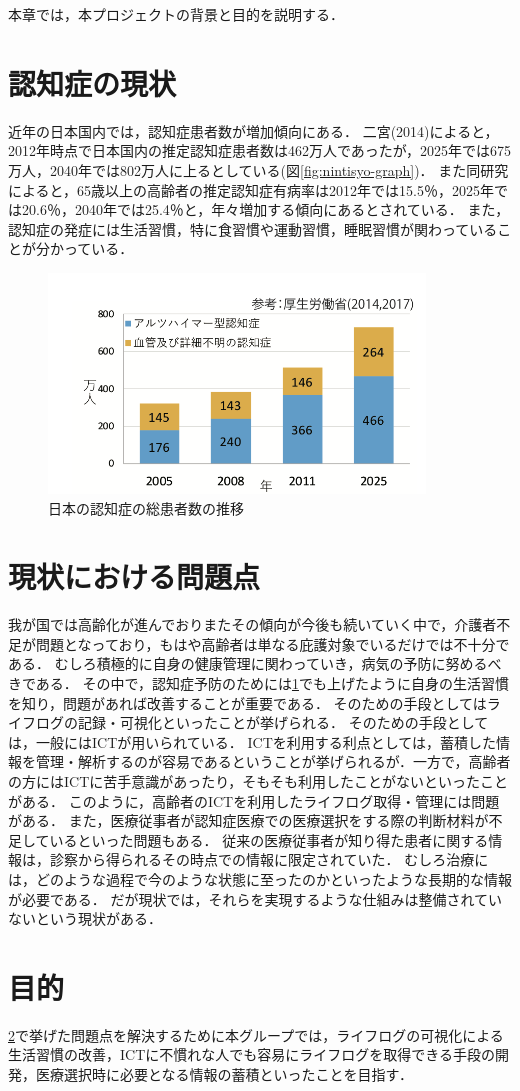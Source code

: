 \documentclass[../report]{subfiles}
\begin{document}
本章では，本プロジェクトの背景と目的を説明する．

\section{認知症の現状} \label{sec:genzyou}
近年の日本国内では，認知症患者数が増加傾向にある．
二宮(2014)によると，2012年時点で日本国内の推定認知症患者数は462万人であったが，2025年では675万人，2040年では802万人に上るとしている(図\ref{fig:nintisyo-graph})．
また同研究によると，65歳以上の高齢者の推定認知症有病率は2012年では15.5％，2025年では20.6％，2040年では25.4％と，年々増加する傾向にあるとされている．
また，認知症の発症には生活習慣，特に食習慣や運動習慣，睡眠習慣が関わっていることが分かっている\cite{seikatsu}．
\begin{figure}[htbp]
    \begin{center}
        \includegraphics[width=10cm]{imgs/ninchisyo-graph.png}
        \caption{日本の認知症の総患者数の推移}
        \label{fig:ninchisyo-graph}
    \end{center}
\end{figure}

\section{現状における問題点} \label{sec:mondai}
我が国では高齢化が進んでおりまたその傾向が今後も続いていく中で，介護者不足が問題となっており，もはや高齢者は単なる庇護対象でいるだけでは不十分である．
むしろ積極的に自身の健康管理に関わっていき，病気の予防に努めるべきである．
その中で，認知症予防のためには\ref{sec:genzyou}でも上げたように自身の生活習慣を知り，問題があれば改善することが重要である．
そのための手段としてはライフログの記録・可視化といったことが挙げられる\cite{lifelog}．
そのための手段としては，一般にはICTが用いられている．
ICTを利用する利点としては，蓄積した情報を管理・解析するのが容易であるということが挙げられるが．一方で，高齢者の方にはICTに苦手意識があったり，そもそも利用したことがないといったことがある．
このように，高齢者のICTを利用したライフログ取得・管理には問題がある．
また，医療従事者が認知症医療での医療選択をする際の判断材料が不足しているといった問題もある．
従来の医療従事者が知り得た患者に関する情報は，診察から得られるその時点での情報に限定されていた．
むしろ治療には，どのような過程で今のような状態に至ったのかといったような長期的な情報が必要である．
だが現状では，それらを実現するような仕組みは整備されていないという現状がある．

\section{目的}
\ref{sec:mondai}で挙げた問題点を解決するために本グループでは，ライフログの可視化による生活習慣の改善，ICTに不慣れな人でも容易にライフログを取得できる手段の開発，医療選択時に必要となる情報の蓄積といったことを目指す．
\end{document}
